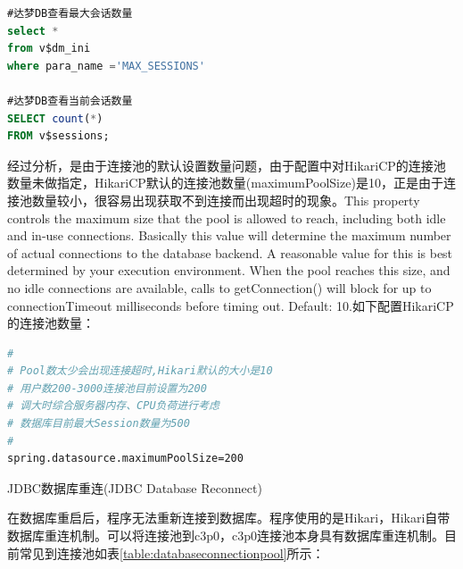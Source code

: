 \documentclass[12pt]{book}
\makeatletter
\numberwithin{dummy}{section}
\theoremstyle{ocrenumbox}
\theoremstyle{blacknumex}
\theoremstyle{blacknumbox}
\theoremstyle{ocrenum}
\renewcommand{\subsection}{\@startsection {subsection}{2}{\z@}
	{-3ex \@plus -0.1ex \@minus -.4ex}
	{0.5ex \@plus.2ex }
	{\normalfont\sffamily\bfseries}}
\makeatother
\begin{document}
\begin{lstlisting}[language=SQL]
#达梦DB查看最大会话数量
select *
from v$dm_ini
where para_name ='MAX_SESSIONS'

#达梦DB查看当前会话数量
SELECT count(*)
FROM v$sessions;
\end{lstlisting}

经过分析，是由于连接池的默认设置数量问题，由于配置中对HikariCP的连接池数量未做指定，HikariCP默认的连接池数量(maximumPoolSize)是10，正是由于连接池数量较小，很容易出现获取不到连接而出现超时的现象。This property controls the maximum size that the pool is allowed to reach, including both idle and in-use connections. Basically this value will determine the maximum number of actual connections to the database backend. A reasonable value for this is best determined by your execution environment. When the pool reaches this size, and no idle connections are available, calls to getConnection() will block for up to connectionTimeout milliseconds before timing out. Default: 10.如下配置HikariCP的连接池数量：

\begin{lstlisting}[language=Bash]
#
# Pool数太少会出现连接超时,Hikari默认的大小是10
# 用户数200-3000连接池目前设置为200
# 调大时综合服务器内存、CPU负荷进行考虑
# 数据库目前最大Session数量为500
#
spring.datasource.maximumPoolSize=200
\end{lstlisting}


\subsection{JDBC数据库重连(JDBC Database Reconnect)}

在数据库重启后，程序无法重新连接到数据库。程序使用的是Hikari，Hikari自带数据库重连机制。可以将连接池到c3p0，c3p0连接池本身具有数据库重连机制。目前常见到连接池如表\ref{table:databaseconnectionpool}所示：
\end{document}
